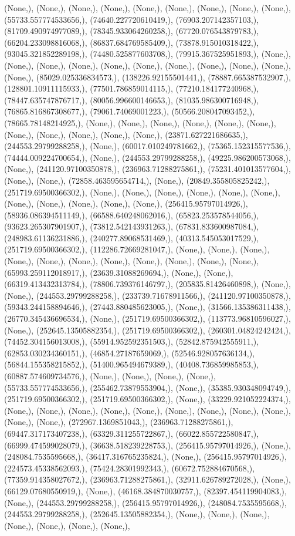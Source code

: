 \documentclass{article}
\begin{document}
(None,), (None,), (None,), (None,), (None,), (None,), (None,), (None,), (None,), (55733.557774533656,), (74640.227720610419,), (76903.207142357103,), (81709.490974977089,), (78345.933064260258,), (67720.076543879783,), (66204.233098816068,), (86837.684769585409,), (73878.915010318422,), (93045.321852289198,), (74480.525877603708,), (79915.367525951893,), (None,), (None,), (None,), (None,), (None,), (None,), (None,), (None,), (None,), (None,), (None,), (85029.025336834573,), (138226.92155501441,), (78887.665387532907,), (128801.10911115933,), (77501.786859014115,), (77210.184177240968,), (78447.635747876717,), (80056.996600146653,), (81035.986300716948,), (76865.816867308677,), (79061.74069001223,), (50566.208047093452,), (78665.78148214925,), (None,), (None,), (None,), (None,), (None,), (None,), (None,), (None,), (None,), (None,), (None,), (23871.627221686635,), (244553.29799288258,), (None,), (60017.010249781662,), (75365.152315577536,), (74444.009224700654,), (None,), (244553.29799288258,), (49225.986200573068,), (None,), (241120.97100350878,), (236963.71288275861,), (75231.401013577604,), (None,), (None,), (72858.463595654714,), (None,), (20849.355805825242,), (251719.69500366302,), (None,), (None,), (None,), (None,), (None,), (None,), (None,), (None,), (None,), (None,), (None,), (256415.95797014926,), (58936.086394511149,), (66588.640248062016,), (65823.253578544056,), (93623.265307901907,), (73812.542143931263,), (67831.833600987084,), (248983.61136231886,), (240277.89068531469,), (40313.545053017529,), (251719.69500366302,), (112286.72669281047,), (None,), (None,), (None,), (None,), (None,), (None,), (None,), (None,), (None,), (None,), (None,), (65993.259112018917,), (23639.31088269694,), (None,), (None,), (66319.413432313784,), (78806.739376146797,), (205835.81426460898,), (None,), (None,), (244553.29799288258,), (233739.71678911566,), (241120.97100350878,), (59343.244158894646,), (27443.880485623005,), (None,), (31566.135386311438,), (26770.345436696534,), (None,), (251719.69500366302,), (113773.96810596027,), (None,), (252645.13505882354,), (251719.69500366302,), (260301.04824242424,), (74452.304156013008,), (55914.952592351503,), (52842.875942555911,), (62853.030234360151,), (46854.27187659069,), (52546.928057636134,), (56844.155358215852,), (51400.965494679389,), (40408.736859985853,), (60887.574609734576,), (None,), (None,), (None,), (None,), (55733.557774533656,), (255462.73879553904,), (None,), (35385.930348094749,), (251719.69500366302,), (251719.69500366302,), (None,), (33229.921052224374,), (None,), (None,), (None,), (None,), (None,), (None,), (None,), (None,), (None,), (None,), (None,), (272967.1369851043,), (236963.71288275861,), (69447.317173407238,), (63329.311255722867,), (66022.855722580847,), (66999.474599028079,), (36638.518239228753,), (256415.95797014926,), (None,), (248084.7535595668,), (36417.316765235824,), (None,), (256415.95797014926,), (224573.45338562093,), (75424.28301992343,), (60672.752884670568,), (77359.914358027672,), (236963.71288275861,), (32911.626789272028,), (None,), (66129.07680550919,), (None,), (46168.384870030757,), (82397.454119904083,), (None,), (244553.29799288258,), (256415.95797014926,), (248084.7535595668,), (244553.29799288258,), (252645.13505882354,), (None,), (None,), (None,), (None,), (None,), (None,), (None,), 
\end{document}
